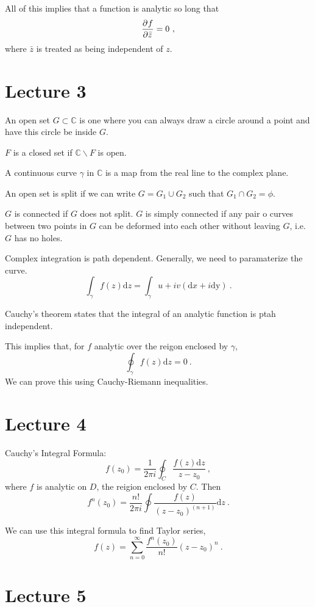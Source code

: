 \documentclass[11pt, a4paper]{Article}
\begin{document}
All of this implies that a function is analytic so long that
$$
	\frac{\partial^{} {f}}{\partial {\bar{z}}^{}} = 0~,
$$
where $\bar{z}$ is treated as being independent of $z$.

\section{Lecture 3}

An open set $G\subset\mathbb{C}$ is one where you can always draw a circle around a point and have this circle be inside $G$.

$F$ is a closed set if $\mathbb{C}\backslash F$ is open.

A continuous curve $\gamma$ in $\mathbb{C}$ is a map from the real line to the complex plane.

An open set is split if we can write $G = G_1 \cup G_2$ such that $G_1 \cap G_2 = \phi$.

$G$ is connected if $G$ does not split.
$G$ is simply connected if any pair o curves between two points in $G$ can be deformed into each other without leaving $G$, i.e. $G$ has no holes.

Complex integration is path dependent. 
Generally, we need to paramaterize the curve.
$$
	\int_\gamma f(z)\mathrm{d}z = \int_\gamma u+iv(\mathrm{d}x + i\mathrm{dy})~.
$$

Cauchy's theorem states that the integral of an analytic function is ptah independent.

This implies that, for $f$ analytic over the reigon enclosed by $\gamma$,
$$
	\oint_\gamma f(z)\mathrm{d}z = 0~.
$$
We can prove this using Cauchy-Riemann inequalities.

\section{Lecture 4}

Cauchy's Integral Formula:
$$
	f(z_0) = \frac{1}{2\pi i} \oint_C \frac{f(z)\mathrm{d}z}{z-z_0}~,
$$
where $f$ is analytic on $D$, the reigion enclosed by $C$. Then
$$
f^n(z_0) = \frac{n!}{2\pi i} \oint \frac{f(z)}{(z-z_0)^(n+1)} \mathrm{d}z~.
$$

We can use this integral formula to find Taylor series,
$$
	f(z) = \sum_{n=0}^\infty \frac{f^n(z_0)}{n!}(z-z_0)^n~.
$$


\section{Lecture 5}
\end{document}
